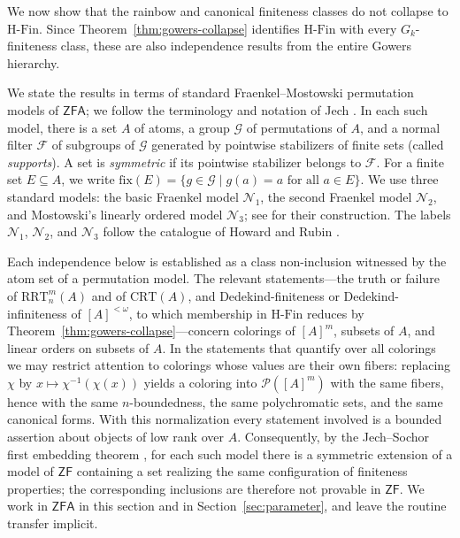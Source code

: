 \documentclass[11pt]{amsart}
\theoremstyle{definition}
\newcommand{\ZF}{\mathsf{ZF}}
\newcommand{\ZFA}{\mathsf{ZFA}}
\newcommand{\HFin}{\mathrm{H\text{-}Fin}}
\newcommand{\RRT}{\mathrm{RRT}}
\newcommand{\CRT}{\mathrm{CRT}}
\newcommand{\NN}{\mathcal{N}}
\begin{document}
We now show that the rainbow and canonical finiteness classes do not collapse to \(\HFin\).  Since Theorem~\ref{thm:gowers-collapse} identifies \(\HFin\) with every \(G_k\)-finiteness class, these are also independence results from the entire Gowers hierarchy.

We state the results in terms of standard Fraenkel--Mostowski permutation models of \(\ZFA\); we follow the terminology and notation of Jech \cite[Chapter~4]{JechAC}.  In each such model, there is a set \(A\) of atoms, a group \(\mathcal G\) of permutations of \(A\), and a normal filter \(\mathcal F\) of subgroups of \(\mathcal G\) generated by pointwise stabilizers of finite sets (called \emph{supports}).  A set is \emph{symmetric} if its pointwise stabilizer belongs to \(\mathcal F\).  For a finite set \(E\subseteq A\), we write \(\mathrm{fix}(E)=\{g\in\mathcal G\mid g(a)=a\text{ for all }a\in E\}\).  We use three standard models: the basic Fraenkel model \(\NN_1\), the second Fraenkel model \(\NN_2\), and Mostowski's linearly ordered model \(\NN_3\); see \cite[Chapter~4]{JechAC} for their construction.  The labels \(\NN_1\), \(\NN_2\), and \(\NN_3\) follow the catalogue of Howard and Rubin \cite{HowardRubin}.

Each independence below is established as a class non-inclusion witnessed by the atom set of a permutation model.  The relevant statements---the truth or failure of \(\RRT^m_n(A)\) and of \(\CRT(A)\), and Dedekind-finiteness or Dedekind-infiniteness of \([A]^{<\omega}\), to which membership in \(\HFin\) reduces by Theorem~\ref{thm:gowers-collapse}---concern colorings of \([A]^m\), subsets of \(A\), and linear orders on subsets of \(A\).  In the statements that quantify over all colorings we may restrict attention to colorings whose values are their own fibers: replacing \(\chi\) by \(x\mapsto\chi^{-1}(\chi(x))\) yields a coloring into \(\mathcal P([A]^m)\) with the same fibers, hence with the same \(n\)-boundedness, the same polychromatic sets, and the same canonical forms.  With this normalization every statement involved is a bounded assertion about objects of low rank over \(A\).  Consequently, by the Jech--Sochor first embedding theorem \cite[Theorem~6.1]{JechAC}, for each such model there is a symmetric extension of a model of \(\ZF\) containing a set realizing the same configuration of finiteness properties; the corresponding inclusions are therefore not provable in \(\ZF\).  We work in \(\ZFA\) in this section and in Section~\ref{sec:parameter}, and leave the routine transfer implicit.
\end{document}
